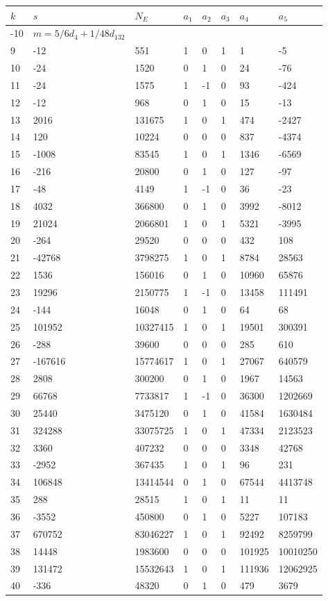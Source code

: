 \documentclass{amsart}
\begin{document}
\begin{longtable}{|l|l|l|lllll|}
\hline
$k$ & $s$ & $N_E$ & $a_1$ & $a_2$ & $a_3$ & $a_4$ & $a_5$\\
\hline
-10&$m=5/6d_{4}+1/48d_{132}$&&\multicolumn{5}{c|}{}\\
9&-12&551&1&0&1&1&-5\\
10&-24&1520&0&1&0&24&-76\\
11&-24&1575&1&-1&0&93&-424\\
12&-12&968&0&1&0&15&-13\\
13&2016&131675&1&0&1&474&-2427\\
14&120&10224&0&0&0&837&-4374\\
15&-1008&83545&1&0&1&1346&-6569\\
16&-216&20800&0&1&0&127&-97\\
17&-48&4149&1&-1&0&36&-23\\
18&4032&366800&0&1&0&3992&-8012\\
19&21024&2066801&1&0&1&5321&-3995\\
20&-264&29520&0&0&0&432&108\\
21&-42768&3798275&1&0&1&8784&28563\\
22&1536&156016&0&1&0&10960&65876\\
23&19296&2150775&1&-1&0&13458&111491\\
24&-144&16048&0&1&0&64&68\\
25&101952&10327415&1&0&1&19501&300391\\
26&-288&39600&0&0&0&285&610\\
27&-167616&15774617&1&0&1&27067&640579\\
28&2808&300200&0&1&0&1967&14563\\
29&66768&7733817&1&-1&0&36300&1202669\\
30&25440&3475120&0&1&0&41584&1630484\\
31&324288&33075725&1&0&1&47334&2123523\\
32&3360&407232&0&0&0&3348&42768\\
33&-2952&367435&1&0&1&96&231\\
34&106848&13414544&0&1&0&67544&4413748\\
35&288&28515&1&0&1&11&11\\
36&-3552&450800&0&1&0&5227&107183\\
37&670752&83046227&1&0&1&92492&8259799\\
38&14448&1983600&0&0&0&101925&10010250\\
39&131472&15532643&1&0&1&111936&12062925\\
40&-336&48320&0&1&0&479&3679\\

\end{longtable}
\end{document}
